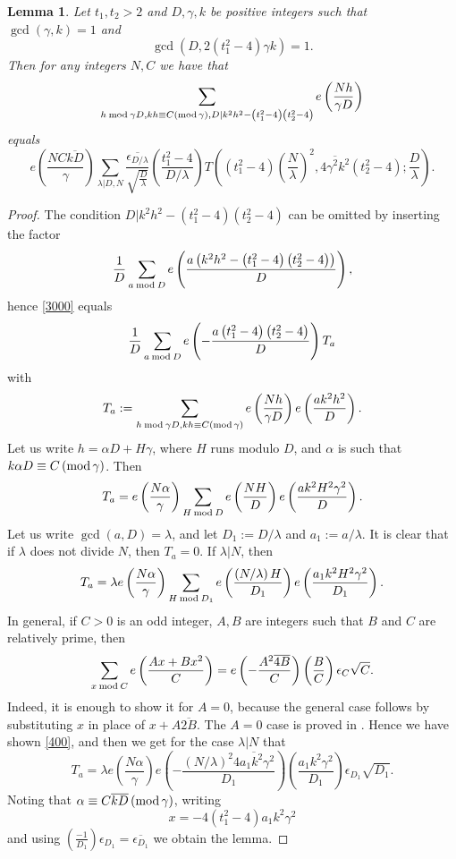 \documentclass[12pt]{amsart}
\newtheorem{lemma}[theorem]{Lemma}
\theoremstyle{definition}
\numberwithin{equation}{section}
\begin{document}
\begin{lemma}\label{lem:14,9}Let $t_1,t_2>2$ and $D,\gamma ,k$ be positive
integers such that $\gcd\left(\gamma ,k\right)=1$ and
\[\gcd\left(D,2\left(t_1^2-4\right)\gamma k\right)=1.\]
Then for any integers $N,C$ we have that
\begin{equation}\sum_{h\:{\rm m}{\rm o}{\rm d}\:\gamma D,kh\equiv
C\left({\rm m}{\rm o}{\rm d}\,\gamma\right),D|k^2h^2-\left(t_1^2-
4\right)\left(t_2^2-4\right)}e\left(\frac {Nh}{\gamma D}\right)\label{3000}\end{equation}
equals
\[e\left(\frac {NC\overline {kD}}{\gamma}\right)\sum_{\lambda |D,
N}\frac {\overline {\epsilon_{D/\lambda}}}{\sqrt {\frac D{\lambda}}}\left
(\frac {t_1^2-4}{D/\lambda}\right)T\left(\left(t_1^2-4\right)\left
(\frac N{\lambda}\right)^2,\overline {4\gamma^2k^2}\left(t_2^2-4\right
);\frac D{\lambda}\right).\]
\end{lemma}
\begin{proof}The condition $D|k^2h^2-\left(t_1^2-4\right)\left(t_
2^2-4\right)$ can be
omitted by inserting the factor
\[\frac 1D\sum_{a\:{\rm m}{\rm o}{\rm d}\:D}e\left(\frac {a\left(
k^2h^2-\left(t_1^2-4\right)\left(t_2^2-4\right)\right)}D\right),\]
hence \eqref{3000} equals
\[\frac 1D\sum_{a\:{\rm m}{\rm o}{\rm d}\:D}e\left(-\frac {a\left
(t_1^2-4\right)\left(t_2^2-4\right)}D\right)T_a\]
with
\[T_a:=\sum_{h\:{\rm m}{\rm o}{\rm d}\:\gamma D,kh\equiv C\left({\rm m}
{\rm o}{\rm d}\,\gamma\right)}e\left(\frac {Nh}{\gamma D}\right)e\left
(\frac {ak^2h^2}D\right).\]
Let us  write $h=\alpha D+H\gamma$, where $H$ runs modulo
$D$, and $\alpha$ is such that $k\alpha D\equiv C\left({\rm m}{\rm o}
{\rm d}\,\gamma\right)$. Then
\[T_a=e\left(\frac {N\alpha}{\gamma}\right)\sum_{H\:{\rm m}{\rm o}
{\rm d}\:D}e\left(\frac {NH}D\right)e\left(\frac {ak^2H^2\gamma^2}
D\right).\]
Let us write $\gcd\left(a,D\right)=\lambda$, and let $D_1:=D/\lambda$ and
$a_1:=a/\lambda$. It is clear that if $\lambda$ does not divide $
N$, then $T_a=0$. If
$\lambda |N$, then
\[T_a=\lambda e\left(\frac {N\alpha}{\gamma}\right)\sum_{H\:{\rm m}
{\rm o}{\rm d}\:D_1}e\left(\frac {\left(N/\lambda\right)H}{D_1}\right
)e\left(\frac {a_1k^2H^2\gamma^2}{D_1}\right).\]
In general, if $C>0$ is an odd integer, $A,B$ are integers
such that $B$ and $C$ are relatively prime, then
\begin{equation}\sum_{x\:{\rm m}{\rm o}{\rm d}\:C}e\left(\frac {A
x+Bx^2}C\right)=e\left(-\frac {A^2\overline {4B}}C\right)\left(\frac
BC\right)\epsilon_C\sqrt {C}.\label{400}\end{equation}
Indeed, it is enough to show it for $A=0$, because the
general case follows by substituting $x$ in place of
$x+A\overline {2B}$. The $A=0$ case is proved in \cite[Lemma 4.8]{I}. Hence we have
shown \eqref{400}, and then we get for the case $\lambda |N$ that
\[T_a=\lambda e\left(\frac {N\alpha}{\gamma}\right)e\left(-\frac {\left
(N/\lambda\right)^2\overline {4a_1k^2\gamma^2}}{D_1}\right)\left(\frac {
a_1k^2\gamma^2}{D_1}\right)\epsilon_{D_1}\sqrt {D_1}.\]
Noting that $\alpha\equiv C\overline {kD}\left({\rm m}{\rm o}{\rm d}\,
\gamma\right)$, writing
\[x=-4\left(t_1^2-4\right)a_1k^2\gamma^2\]
and using $\left(\frac {-1}{D_1}\right)\epsilon_{D_1}=\overline {
\epsilon_{D_1}}$ we obtain the lemma.
\end{proof}
\end{document}
